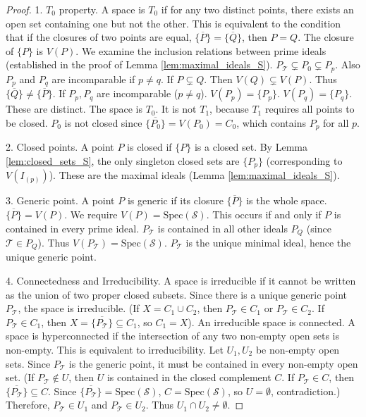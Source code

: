 \documentclass[11pt, a4paper]{article}
\theoremstyle{plain}
\theoremstyle{definition}
\numberwithin{equation}{section}
\newcommand{\Tobj}{\mathcal{T}} %
\newcommand{\SemiringS}{\mathcal{S}}
\newcommand{\Spec}{\mathrm{Spec}}
\begin{document}
\begin{proof}
1. $T_0$ property. A space is $T_0$ if for any two distinct points, there exists an open set containing one but not the other. This is equivalent to the condition that if the closures of two points are equal, $\overline{\{P\}}=\overline{\{Q\}}$, then $P=Q$. The closure of $\{P\}$ is $V(P)$.
We examine the inclusion relations between prime ideals (established in the proof of Lemma \ref{lem:maximal_ideals_S}).
$P_{\Tobj} \subsetneq P_0 \subsetneq P_p$. Also $P_p$ and $P_q$ are incomparable if $p\neq q$.
If $P \subsetneq Q$. Then $V(Q) \subsetneq V(P)$. Thus $\overline{\{Q\}} \neq \overline{\{P\}}$.
If $P_p, P_q$ are incomparable ($p\neq q$). $V(P_p)=\{P_p\}$. $V(P_q)=\{P_q\}$. These are distinct.
The space is $T_0$.
It is not $T_1$, because $T_1$ requires all points to be closed. $P_0$ is not closed since $\overline{\{P_0\}} = V(P_0) = C_0$, which contains $P_p$ for all $p$.

2. Closed points. A point $P$ is closed if $\{P\}$ is a closed set. By Lemma \ref{lem:closed_sets_S}, the only singleton closed sets are $\{P_p\}$ (corresponding to $V(I_{(p)})$). These are the maximal ideals (Lemma \ref{lem:maximal_ideals_S}).

3. Generic point. A point $P$ is generic if its closure $\overline{\{P\}}$ is the whole space. $\overline{\{P\}}=V(P)$. We require $V(P)=\Spec(\SemiringS)$. This occurs if and only if $P$ is contained in every prime ideal. $P_{\Tobj}$ is contained in all other ideals $P_Q$ (since $\Tobj \in P_Q$). Thus $V(P_{\Tobj}) = \Spec(\SemiringS)$. $P_{\Tobj}$ is the unique minimal ideal, hence the unique generic point.

4. Connectedness and Irreducibility. A space is irreducible if it cannot be written as the union of two proper closed subsets. Since there is a unique generic point $P_{\Tobj}$, the space is irreducible. (If $X=C_1 \cup C_2$, then $P_{\Tobj} \in C_1$ or $P_{\Tobj} \in C_2$. If $P_{\Tobj} \in C_1$, then $X=\overline{\{P_{\Tobj}\}} \subseteq C_1$, so $C_1=X$).
An irreducible space is connected.
A space is hyperconnected if the intersection of any two non-empty open sets is non-empty. This is equivalent to irreducibility. Let $U_1, U_2$ be non-empty open sets. Since $P_{\Tobj}$ is the generic point, it must be contained in every non-empty open set. (If $P_{\Tobj} \notin U$, then $U$ is contained in the closed complement $C$. If $P_{\Tobj} \in C$, then $\overline{\{P_{\Tobj}\}} \subseteq C$. Since $\overline{\{P_{\Tobj}\}}=\Spec(\SemiringS)$, $C=\Spec(\SemiringS)$, so $U=\emptyset$, contradiction.)
Therefore, $P_{\Tobj} \in U_1$ and $P_{\Tobj} \in U_2$. Thus $U_1 \cap U_2 \neq \emptyset$.
\end{proof}
\end{document}
